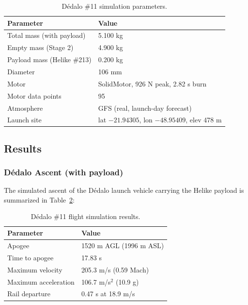 \begin{table}[htbp]
\centering
{\small
\setlength{\tabcolsep}{6pt}
\begin{tabular}{>{\raggedright}p{5.2cm}l}
\toprule
\textbf{Parameter} & \textbf{Value} \\
\midrule
Total mass (with payload) & 5.100 kg \\
Empty mass (Stage 2) & 4.900 kg \\
Payload mass (Helike \#213) & 0.200 kg \\
Diameter & 106 mm \\
Motor & SolidMotor, 926 N peak, 2.82 s burn \\
Motor data points & 95 \\
Atmosphere & GFS (real, launch-day forecast) \\
Launch site & lat $-21.94305$, lon $-48.95409$, elev 478 m \\
\bottomrule
\end{tabular}
\caption{Dédalo \#11 simulation parameters.}
\label{tab:dedalo}

}
\end{table}

\subsection{Results}

\subsubsection{Dédalo Ascent (with payload)}

The simulated ascent of the Dédalo launch vehicle carrying the Helike
payload is summarized in Table~\ref{tab:flight}:

\begin{table}[htbp]
\centering
{\small
\setlength{\tabcolsep}{6pt}
\begin{tabular}{>{\raggedright}p{5.2cm}l}
\toprule
\textbf{Parameter} & \textbf{Value} \\
\midrule
Apogee & 1520 m AGL (1996 m ASL) \\
Time to apogee & 17.83 s \\
Maximum velocity & 205.3 m/s (0.59 Mach) \\
Maximum acceleration & 106.7 m/s$^2$ (10.9 g) \\
Rail departure & 0.47 s at 18.9 m/s \\
\bottomrule
\end{tabular}
\caption{Dédalo \#11 flight simulation results.}
\label{tab:flight}

}
\end{table}

